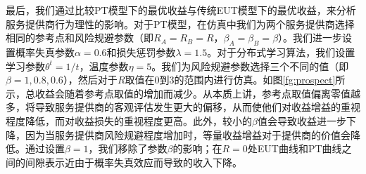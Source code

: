 最后，我们通过比较PT模型下的最优收益与传统EUT模型下的最优收益，来分析服务提供商行为理性的影响。对于PT模型，在仿真中我们为两个服务提供商选择相同的参考点和风险规避参数（即$R_A=R_B= R$，$\beta_A=\beta_B=\beta$）。我们进一步设置概率失真参数$\alpha=0.6$和损失惩罚参数$\lambda=1.5$。对于分布式学习算法，我们设置学习参数$\theta^t=1/t$，温度参数$\eta=5$。我们为风险规避参数选择三个不同的值（即$\beta=1,0.8,0.6$），然后对于$R$取值在0到3的范围内进行仿真。如图\ref{fg:prospect}所示，总收益会随着参考点取值的增加而减少。从本质上讲，参考点取值偏离零值越多，将导致服务提供商的客观评估发生更大的偏移，从而使他们对收益增益的重视程度降低，而对收益损失的重视程度更高。此外，较小的$\beta$值会导致收益进一步下降，因为当服务提供商风险规避程度增加时，等量收益增益对于提供商的价值会降低。通过设置$\beta=1$，我们移除了参数$\beta$的影响；在$R=0$处EUT曲线和PT曲线之间的间隙表示近由于概率失真效应而导致的收入下降。

